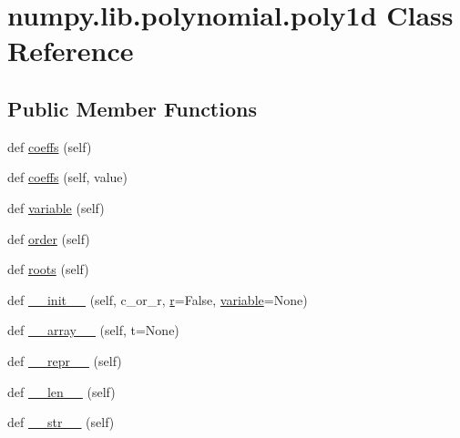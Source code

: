\hypertarget{classnumpy_1_1lib_1_1polynomial_1_1poly1d}{}\section{numpy.\+lib.\+polynomial.\+poly1d Class Reference}
\label{classnumpy_1_1lib_1_1polynomial_1_1poly1d}
\subsection*{Public Member Functions}
\begin{DoxyCompactItemize}
\item 
def \hyperlink{classnumpy_1_1lib_1_1polynomial_1_1poly1d_a1efd0e877693d1985828e0b45749763e}{coeffs} (self)
\item 
def \hyperlink{classnumpy_1_1lib_1_1polynomial_1_1poly1d_ad697c3d0c85fa8d52354ceb339f143ea}{coeffs} (self, value)
\item 
def \hyperlink{classnumpy_1_1lib_1_1polynomial_1_1poly1d_a6a2080b2c425d7792621272ea33e3321}{variable} (self)
\item 
def \hyperlink{classnumpy_1_1lib_1_1polynomial_1_1poly1d_a5d331fa8030de4849acd2c6f7e3f1c49}{order} (self)
\item 
def \hyperlink{classnumpy_1_1lib_1_1polynomial_1_1poly1d_a8880cccbb0a875bf0918d7e9d4928ea1}{roots} (self)
\item 
def \hyperlink{classnumpy_1_1lib_1_1polynomial_1_1poly1d_a3a1a0cf7f6a8213795b475abf6cb4d5a}{\+\_\+\+\_\+init\+\_\+\+\_\+} (self, c\+\_\+or\+\_\+r, \hyperlink{classnumpy_1_1lib_1_1polynomial_1_1poly1d_a94878855e33ca80a7152ae43aea52b50}{r}=False, \hyperlink{classnumpy_1_1lib_1_1polynomial_1_1poly1d_a6a2080b2c425d7792621272ea33e3321}{variable}=None)
\item 
def \hyperlink{classnumpy_1_1lib_1_1polynomial_1_1poly1d_a0c8e8d0e214da10a1cc49c85e955110e}{\+\_\+\+\_\+array\+\_\+\+\_\+} (self, t=None)
\item 
def \hyperlink{classnumpy_1_1lib_1_1polynomial_1_1poly1d_a28aa595322a979a80ac33817864febe4}{\+\_\+\+\_\+repr\+\_\+\+\_\+} (self)
\item 
def \hyperlink{classnumpy_1_1lib_1_1polynomial_1_1poly1d_a004918b84845deee8451471929ca4f1f}{\+\_\+\+\_\+len\+\_\+\+\_\+} (self)
\item 
def \hyperlink{classnumpy_1_1lib_1_1polynomial_1_1poly1d_a273e758033a57d91d7976b1c8ab3a996}{\+\_\+\+\_\+str\+\_\+\+\_\+} (self)
\item 

\end{DoxyCompactItemize}
